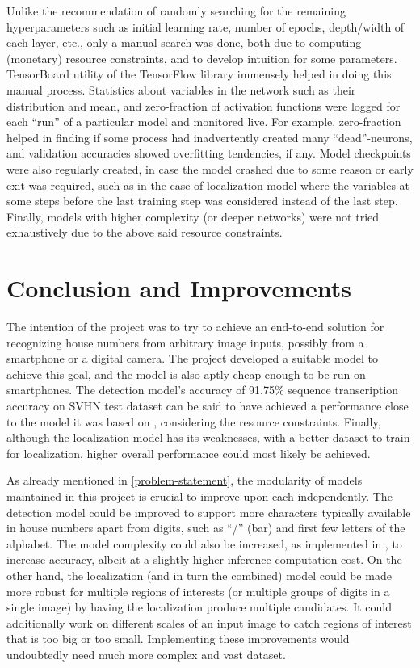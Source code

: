 \documentclass{article}
\begin{document}
	Unlike the recommendation of randomly searching \cite{Bergstra2012} for the remaining hyperparameters such as initial learning rate, number of epochs, depth/width of each layer, etc., only a manual search was done, both due to computing (monetary) resource constraints, and to develop intuition for some parameters. TensorBoard utility of the TensorFlow library immensely helped in doing this manual process. Statistics about variables in the network such as their distribution and mean, and zero-fraction of activation functions were logged for each ``run'' of a particular model and monitored live. For example, zero-fraction helped in finding if some process had inadvertently created many ``dead''-neurons, and validation accuracies showed overfitting tendencies, if any. Model checkpoints were also regularly created, in case the model crashed due to some reason or early exit was required, such as in the case of localization model where the variables at some steps before the last training step was considered instead of the last step. Finally, models with higher complexity (or deeper networks) were not tried exhaustively due to the above said resource constraints.
	
	\section{Conclusion and Improvements}
	The intention of the project was to try to achieve an end-to-end solution for recognizing house numbers from arbitrary image inputs, possibly from a smartphone or a digital camera. The project developed a suitable model to achieve this goal, and the model is also aptly cheap enough to be run on smartphones. The detection model's accuracy of 91.75\% sequence transcription accuracy on SVHN test dataset can be said to have achieved a performance close to the model it was based on \cite{GoodfellowBIAS13}, considering the resource constraints. Finally, although the localization model has its weaknesses, with a better dataset to train for localization, higher overall performance could most likely be achieved.
	
	As already mentioned in \ref{problem-statement}, the modularity of models maintained in this project is crucial to improve upon each independently. The detection model could be improved to support more characters typically available in house numbers apart from digits, such as ``/'' (bar) and first few letters of the alphabet. The model complexity could also be increased, as implemented in \cite{GoodfellowBIAS13}, to increase accuracy, albeit at a slightly higher inference computation cost. On the other hand, the localization (and in turn the combined) model could be made more robust for multiple regions of interests (or multiple groups of digits in a single image) by having the localization produce multiple candidates. It could additionally work on different scales of an input image to catch regions of interest that is too big or too small. Implementing these improvements would undoubtedly need much more complex and vast dataset.
	
\end{document}
